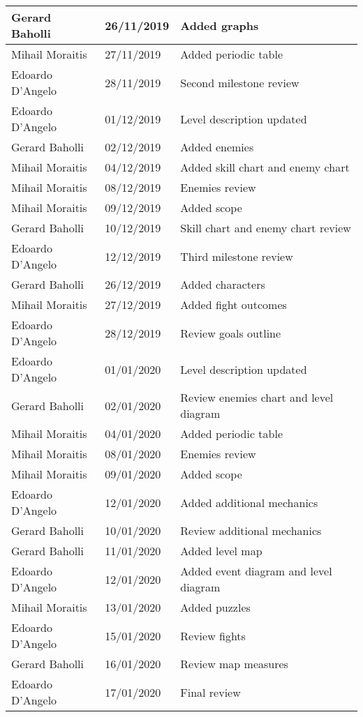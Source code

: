 \begin{center}
\begin{tabular}[c]{| p{3cm} | p{3cm} | p{8cm} |}
			\hline
			Gerard Baholli & 26/11/2019 & Added graphs\\
			\hline
			Mihail Moraitis & 27/11/2019 & Added periodic table\\
			\hline
			Edoardo D'Angelo & 28/11/2019 & Second milestone review\\
			\hline
			Edoardo D'Angelo & 01/12/2019 & Level description updated\\
			\hline
			Gerard Baholli & 02/12/2019 & Added enemies\\
			\hline
			Mihail Moraitis & 04/12/2019 & Added skill chart and enemy chart\\
			\hline
			Mihail Moraitis & 08/12/2019 & Enemies review\\
			\hline
			Mihail Moraitis & 09/12/2019 & Added scope\\
			\hline
			Gerard Baholli & 10/12/2019 & Skill chart and enemy chart review\\
			\hline
			Edoardo D'Angelo & 12/12/2019 & Third milestone review\\
			\hline
			
			Gerard Baholli & 26/12/2019 & Added characters\\
			\hline
			Mihail Moraitis & 27/12/2019 & Added fight outcomes\\
			\hline
			Edoardo D'Angelo & 28/12/2019 & Review goals outline\\
			\hline
			Edoardo D'Angelo & 01/01/2020 & Level description updated\\
			\hline
			Gerard Baholli & 02/01/2020 & Review enemies chart and level diagram\\
			\hline
			Mihail Moraitis & 04/01/2020 & Added periodic table\\
			\hline
			Mihail Moraitis & 08/01/2020 & Enemies review\\
			\hline
			Mihail Moraitis & 09/01/2020 & Added scope\\
			\hline
			Edoardo D'Angelo & 12/01/2020 & Added additional mechanics\\
			\hline
			Gerard Baholli & 10/01/2020 & Review additional mechanics\\
			\hline
			Gerard Baholli & 11/01/2020 & Added level map\\
			\hline
			Edoardo D'Angelo & 12/01/2020 & Added event diagram and level diagram\\
			\hline
			Mihail Moraitis & 13/01/2020 & Added puzzles\\
			\hline
			Edoardo D'Angelo & 15/01/2020 & Review fights\\
			\hline
			Gerard Baholli & 16/01/2020 & Review map measures\\
			\hline
			Edoardo D'Angelo & 17/01/2020 & Final review\\
			\hline
		\end{tabular}
	\end{center}
	